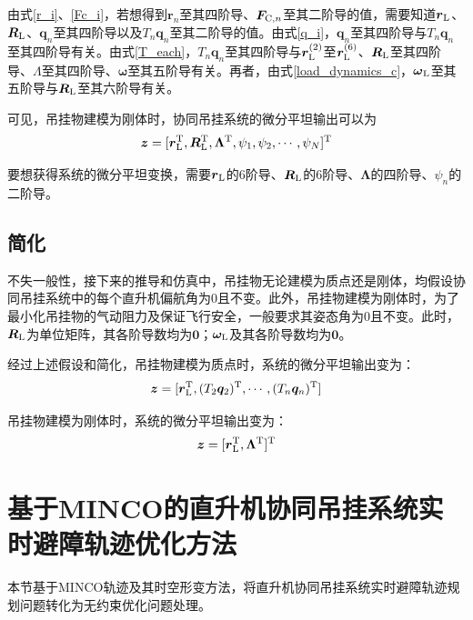 由式\ref{r_i}、\ref{Fc_i}，若想得到$\boldsymbol{r}_n$至其四阶导、$\boldsymbol{F}_{{\rm{C}},n}$至其二阶导的值，需要知道$\boldsymbol{r}{\rm{_L}}$、$\boldsymbol{R}{\rm{_L}}$、$\boldsymbol{q}_n$至其四阶导以及$ T_n \boldsymbol{q}_n$至其二阶导的值。由式\ref{q_i}，$\boldsymbol{q}_n$至其四阶导与$T_n\boldsymbol{q}_n$至其四阶导有关。由式\ref{T_each}，$T_n\boldsymbol{q}_n$至其四阶导与$\boldsymbol{r}_{\rm{L}}^{(2)}$至$\boldsymbol{r}_{\rm{L}}^{(6)}$、$\boldsymbol{R}_{\rm{L}}$至其四阶导、$\Lambda$至其四阶导、$\boldsymbol{\omega}$至其五阶导有关。再者，由式\ref{load_dynamics_c}，$\boldsymbol{\omega}{\rm{_L}}$至其五阶导与$\boldsymbol{R}{\rm{_L}}$至其六阶导有关。

可见，吊挂物建模为刚体时，协同吊挂系统的微分平坦输出可以为
\begin{equation}
    \boldsymbol{z} = [\boldsymbol{r}{\rm{_L^T}}, \boldsymbol{R}{\rm{_L^T}}, \boldsymbol{\Lambda}{\rm{^T}}, \psi_1, \psi_2, \cdots, \psi_N]\rm{^T}
\end{equation}

要想获得系统的微分平坦变换，需要$\boldsymbol{r}{\rm{_L}}$的6阶导、$\boldsymbol{R}{\rm{_L}}$的6阶导、$\boldsymbol{\Lambda}$的四阶导、$\psi_n$的二阶导。

\subsection{简化}
不失一般性，接下来的推导和仿真中，吊挂物无论建模为质点还是刚体，均假设协同吊挂系统中的每个直升机偏航角为0且不变。此外，吊挂物建模为刚体时，为了最小化吊挂物的气动阻力及保证飞行安全，一般要求其姿态角为0且不变。此时，$\boldsymbol{R}_{\rm{L}}$为单位矩阵，其各阶导数均为$\boldsymbol{0}$；$\boldsymbol{\omega}_{\rm{L}}$及其各阶导数均为$\boldsymbol{0}$。

经过上述假设和简化，吊挂物建模为质点时，系统的微分平坦输出变为：
\begin{equation}\label{flatness_point}
    \boldsymbol{z} = [\boldsymbol{r}{\rm{_L^T}}, (T_2\boldsymbol{q}_2){\rm{^T}}, \cdots, (T_n\boldsymbol{q}_n){\rm{^T}}]
\end{equation}

吊挂物建模为刚体时，系统的微分平坦输出变为：
\begin{equation}\label{flatness_rigid}
    \boldsymbol{z} = [\boldsymbol{r}{\rm{_L^T}},  \boldsymbol{\Lambda}{\rm{^T}}]\rm{^T}
\end{equation}

\section{基于MINCO的直升机协同吊挂系统实时避障轨迹优化方法}\label{minco_multilift}
本节基于MINCO轨迹及其时空形变方法\cite{wang2022geometrically}，将直升机协同吊挂系统实时避障轨迹规划问题转化为无约束优化问题处理。

